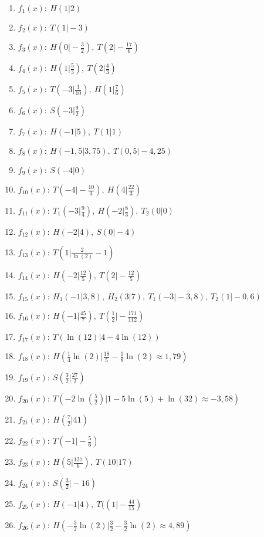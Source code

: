 \begin{Answer}[ref=extrempunkteA1]
	\begin{enumerate}[label=\alph*)]
		\item \(f_1(x):\ H(1\vert 2)\)
		\item \(f_2(x):\ T(1\vert -3)\)
		\item \(f_3(x):\ H(0\vert -\frac{3}{2}),\ T(2\vert -\frac{17}{6})\)
		\item \(f_4(x):\ H(1\vert \frac{5}{3}),\ T(2\vert \frac{4}{3})\)
		\item \(f_5(x):\ T(-3\vert \frac{1}{10}),\ H(1\vert \frac{7}{6})\)
		\item \(f_6(x):\ S(-3\vert \frac{9}{2})\)
		\item \(f_7(x):\ H(-1\vert 5),\ T(1\vert 1)\)
		\item \(f_8(x):\ H(-1,5\vert 3,75),\ T(0,5\vert -4,25)\)
		\item \(f_9(x):\ S(-4\vert 0)\)
		\item \(f_{10}(x):\ T(-4\vert -\frac{10}{3}),\ H(4\vert \frac{22}{3})\)
		\item \(f_{11}(x):\ T_1(-3\vert \frac{9}{4}),\ H(-2\vert \frac{8}{3}),\ T_2(0\vert 0)\)
		\item \(f_{12}(x):\ H(-2\vert 4),\ S(0\vert -4)\)
		\item \(f_{13}(x):\ T(1\vert \frac{2}{\ln(2)}-1)\)
		\item \(f_{14}(x):\ H(-2\vert \frac{12}{5}),\ T(2\vert -\frac{12}{5})\)
		\item \(f_{15}(x):\ H_1(-1\vert 3,8),\ H_2(3\vert 7),\ T_1(-3 \vert -3,8),\ T_2(1\vert -0,6)\)
		\item \(f_{16}(x):\ H(-1\vert \frac{45}{7}),\ T(\frac{1}{2}\vert -\frac{171}{112})\)
		\item \(f_{17}(x):\ T(\ln(12)\vert 4-4\ln(12))\)
		\item \(f_{18}(x):\ H(\frac{1}{4}\ln(2)\vert \frac{18}{5}-\frac{1}{8}\ln(2)\approx 1,79)\)
		\item \(f_{19}(x):\ S(\frac{3}{2}\vert \frac{27}{2})\)
		\item \(f_{20}(x):\ T\left(-2\ln\left(\frac{5}{2}\right)\vert 1-5\ln(5)+\ln(32)\approx -3,58\right)\)
		\item \(f_{21}(x):\ H\left(\frac{7}{2}\vert 41\right)\)
		\item \(f_{22}(x):\ T(-1\vert-\frac{5}{6})\)
		\item \(f_{23}(x):\ H\left(5\vert\frac{127}{6}\right),\ T(10\vert 17)\)
		\item \(f_{24}(x):\ S\left(\frac{3}{2}\vert -16\right)\)
		\item \(f_{25}(x):\ H(-1\vert 4),\ T(\left(1\vert -\frac{44}{15}\right)\)
		\item \(f_{26}(x):\ H\left(-\frac{3}{2}\ln(2)\vert \frac{3}{2}-\frac{3}{2}\ln(2)\approx 4,89\right)\)
	\end{enumerate}
\end{Answer}